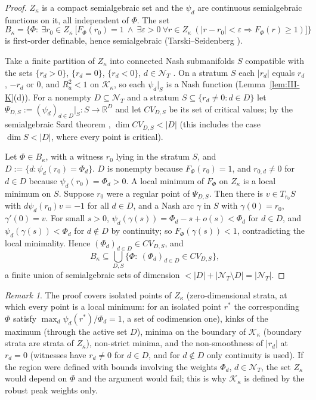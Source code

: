 \documentclass[10pt]{amsart}
\theoremstyle{definition}
\theoremstyle{remark}
\newtheorem{remark}[theorem]{Remark}
\newcommand{\R}{\mathbb R}
\begin{document}
\begin{proof}
$Z_\kappa$ is a compact semialgebraic set and the $\psi_d$ are continuous
semialgebraic functions on it, all independent of $\Phi$.  The set
\[
 B_\kappa=\big\{\Phi:\ \exists r_0\in Z_\kappa\ \big[F_\Phi(r_0)=1\ \wedge\
 \exists\varepsilon>0\ \forall r\in Z_\kappa\ (|r-r_0|<\varepsilon\Rightarrow
 F_\Phi(r)\ge1)\big]\big\}
\]
is first-order definable, hence semialgebraic (Tarski--Seidenberg \cite{Tarski,Seidenberg}).

Take a finite partition of $Z_\kappa$ into connected Nash submanifolds $S$
compatible with the sets $\{r_d>0\}$, $\{r_d=0\}$, $\{r_d<0\}$, $d\in\mathcal
N_T$ \cite[Proposition~9.1.8]{BCR}.  On a stratum $S$ each $|r_d|$ equals
$r_d$, $-r_d$ or $0$, and $R_a^2<1$ on $\mathcal K_\kappa$, so each $\psi_d|_S$ is
a Nash function (Lemma~\ref{lem:III-K}(d)).  For a nonempty $D\subseteq\mathcal
N_T$ and a stratum $S\subseteq\{r_d\ne0:d\in D\}$ let $\Psi_{D,S}:=(\psi_d)_{d\in
D}|_S:S\to\R^D$ and let $CV_{D,S}$ be its set of critical values; by the
semialgebraic Sard theorem \cite[Theorem~9.6.2]{BCR}, $\dim CV_{D,S}<|D|$
(this includes the case $\dim S<|D|$, where every point is critical).

Let $\Phi\in B_\kappa$, with a witness $r_0$ lying in the stratum $S$, and
$D:=\{d:\psi_d(r_0)=\Phi_d\}$.  $D$ is nonempty because $F_\Phi(r_0)=1$, and
$r_{0,d}\ne0$ for $d\in D$ because $\psi_d(r_0)=\Phi_d>0$.  A local minimum of
$F_\Phi$ on $Z_\kappa$ is a local minimum on $S$.  Suppose $r_0$ were a regular
point of $\Psi_{D,S}$.  Then there is $v\in T_{r_0}S$ with $d\psi_d(r_0)v=-1$
for all $d\in D$, and a Nash arc $\gamma$ in $S$ with $\gamma(0)=r_0$, $\gamma'(0)=v$.
For small $s>0$, $\psi_d(\gamma(s))=\Phi_d-s+o(s)<\Phi_d$ for $d\in D$, and
$\psi_d(\gamma(s))<\Phi_d$ for $d\notin D$ by continuity; so $F_\Phi(\gamma(s))<1$,
contradicting the local minimality.  Hence $(\Phi_d)_{d\in D}\in CV_{D,S}$, and
\[
 B_\kappa\subseteq\bigcup_{D,S}\big\{\Phi:\ (\Phi_d)_{d\in D}\in CV_{D,S}\big\},
\]
a finite union of semialgebraic sets of dimension $<|D|+|\mathcal N_T\setminus
D|=|\mathcal N_T|$.
\end{proof}

\begin{remark}\label{rem:III-NLMcases}
The proof covers isolated points of $Z_\kappa$ (zero-dimensional strata, at
which every point is a local minimum: for an isolated point $r^*$ the
corresponding $\Phi$ satisfy $\max_d\psi_d(r^*)/\Phi_d=1$, a set of codimension
one), kinks of the maximum
(through the active set $D$), minima on the boundary of $\mathcal K_\kappa$
(boundary strata are strata of $Z_\kappa$), non-strict minima, and the
non-smoothness of $|r_d|$ at $r_d=0$ (witnesses have $r_d\ne0$ for $d\in D$,
and for $d\notin D$ only continuity is used).  If the region were defined
with bounds involving the weights $\Phi_d$, $d\in\mathcal N_T$, the set
$Z_\kappa$ would depend on $\Phi$ and the argument would fail; this is why
$\mathcal K_\kappa$ is defined by the robust peak weights only.
\end{remark}
\end{document}
